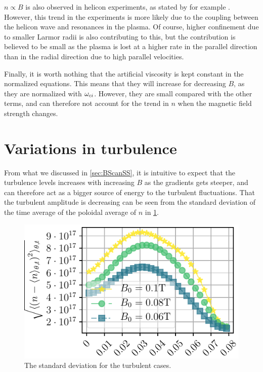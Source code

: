 $n\propto B$ is also observed in helicon experiments, as stated by for example \cite{Tynan2006a}.
However, this trend in the experiments is more likely due to the coupling between the helicon wave and resonances in the plasma.
Of course, higher confinement due to smaller Larmor radii is also contributing to this, but the contribution is believed to be small as the plasma is lost at a higher rate in the parallel direction than in the radial direction due to high parallel velocities.

Finally, it is worth nothing that the artificial viscosity is kept constant in the normalized equations.
This means that they will increase for decreasing $B$, as they are normalized with $\omega_{ci}$.
However, they are small compared with the other terms, and can therefore not account for the trend in $n$ when the magnetic field strength changes.

\section{Variations in turbulence}
%
From what we discussed in \cref{sec:BScanSS}, it is intuitive to expect that the turbulence levels increases with increasing $B$ as the gradients gets steeper, and can therefore act as a bigger source of energy to the turbulent fluctuations.
That the turbulent amplitude is decreasing can be seen from the standard deviation of the time average of the poloidal average of $n$ in \cref{fig:BScanPosOfFluct}.
%
\begin{figure}[htb]
    \centering
    \includegraphics{fig/results/bScan/BScanPosOfFluct}
    \caption{The standard deviation for the turbulent cases.}
    \label{fig:BScanPosOfFluct}
\end{figure}
%

